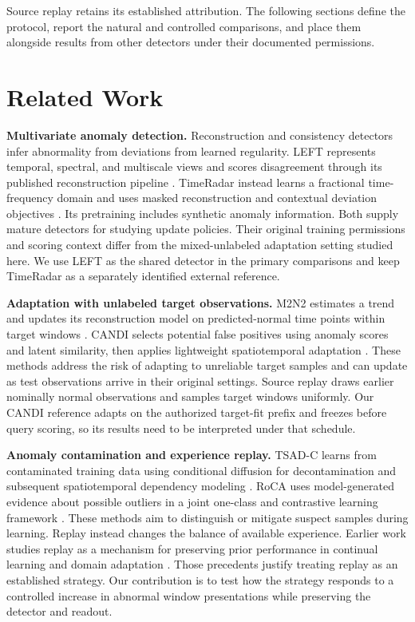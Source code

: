 \documentclass[
  american,
]{article}
\begin{document}
Source replay retains its established attribution. The following
sections define the protocol, report the natural and controlled
comparisons, and place them alongside results from other detectors under
their documented permissions.

\section{Related Work}\label{related-work}

\textbf{Multivariate anomaly detection.} Reconstruction and consistency
detectors infer abnormality from deviations from learned regularity.
LEFT represents temporal, spectral, and multiscale views and scores
disagreement through its published reconstruction pipeline
\citep{left2026}. TimeRadar instead learns a fractional time-frequency
domain and uses masked reconstruction and contextual deviation
objectives \citep{timeradar2026}. Its pretraining includes synthetic
anomaly information. Both supply mature detectors for studying update
policies. Their original training permissions and scoring context differ
from the mixed-unlabeled adaptation setting studied here. We use LEFT as
the shared detector in the primary comparisons and keep TimeRadar as a
separately identified external reference.

\textbf{Adaptation with unlabeled target observations.} M2N2 estimates a
trend and updates its reconstruction model on predicted-normal time
points within target windows \citep{m2n22024}. CANDI selects potential
false positives using anomaly scores and latent similarity, then applies
lightweight spatiotemporal adaptation \citep{candi2026}. These methods
address the risk of adapting to unreliable target samples and can update
as test observations arrive in their original settings. Source replay
draws earlier nominally normal observations and samples target windows
uniformly. Our CANDI reference adapts on the authorized target-fit
prefix and freezes before query scoring, so its results need to be
interpreted under that schedule.

\textbf{Anomaly contamination and experience replay.} TSAD-C learns from
contaminated training data using conditional diffusion for
decontamination and subsequent spatiotemporal dependency modeling
\citep{tsadc2025}. RoCA uses model-generated evidence about possible
outliers in a joint one-class and contrastive learning framework
\citep{roca2026}. These methods aim to distinguish or mitigate suspect
samples during learning. Replay instead changes the balance of available
experience. Earlier work studies replay as a mechanism for preserving
prior performance in continual learning and domain adaptation
\citep{rolnick2019, buzzega2020, rostami2021}. Those precedents justify
treating replay as an established strategy. Our contribution is to test
how the strategy responds to a controlled increase in abnormal window
presentations while preserving the detector and readout.
\end{document}
